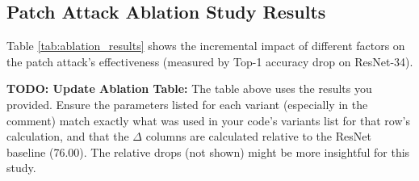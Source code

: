 \documentclass[letterpaper]{article}
\begin{document}
\subsection{Patch Attack Ablation Study Results}
Table \ref{tab:ablation_results} shows the incremental impact of different factors on the patch attack's effectiveness (measured by Top-1 accuracy drop on ResNet-34).
\begin{table}[h!]
\centering
\caption{Patch Attack Ablation Study on ResNet-34 (Target: Lowest Top-1)}
\label{tab:ablation_results}
\end{table}
\textbf{TODO: Update Ablation Table:} The table above uses the results you provided. Ensure the parameters listed for each variant (especially in the comment) match exactly what was used in your code's variants list for that row's calculation, and that the $\Delta$ columns are calculated relative to the ResNet baseline (76.00). The relative drops (not shown) might be more insightful for this study.
\end{document}
